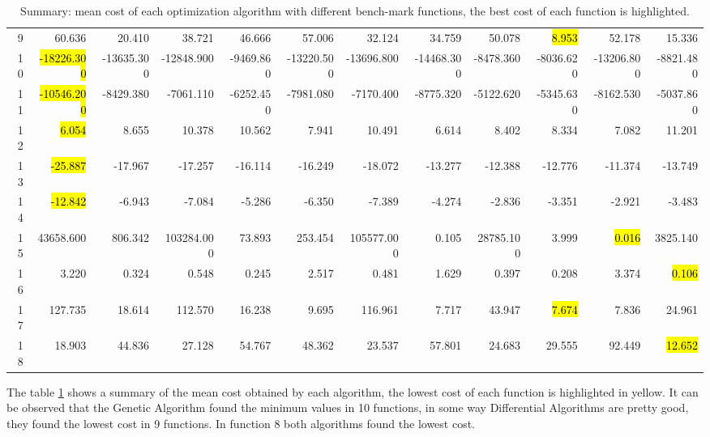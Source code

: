 \documentclass[12pt]{article}
\begin{document}
\begin{landscape}
\begin{table}[H]
\begin{tabular}{rrrrrrrrrrrr}
    9 &     60.636 &         20.410 &         38.721 &             46.666 &         57.006 &         32.124 &         34.759 &         50.078 &              \hl{8.953} &         52.178 &         15.336 \\
    10 & \hl{-18226.300} &     -13635.300 &     -12848.900 &          -9469.860 &     -13220.500 &     -13696.800 &     -14468.300 &      -8478.360 &          -8036.620 &     -13206.800 &      -8821.480 \\
    11 & \hl{-10546.200} &      -8429.380 &      -7061.110 &          -6252.450 &      -7981.080 &      -7170.400 &      -8775.320 &      -5122.620 &          -5345.630 &      -8162.530 &      -5037.860 \\
    12 &      \hl{6.054} &          8.655 &         10.378 &             10.562 &          7.941 &         10.491 &          6.614 &          8.402 &              8.334 &          7.082 &         11.201 \\
    13 &    \hl{-25.887} &        -17.967 &        -17.257 &            -16.114 &        -16.249 &        -18.072 &        -13.277 &        -12.388 &            -12.776 &        -11.374 &        -13.749 \\
    14 &    \hl{-12.842} &         -6.943 &         -7.084 &             -5.286 &         -6.350 &         -7.389 &         -4.274 &         -2.836 &             -3.351 &         -2.921 &         -3.483 \\
    15 &  43658.600 &        806.342 &     103284.000 &             73.893 &        253.454 &     105577.000 &          0.105 &      28785.100 &              3.999 &          \hl{0.016} &       3825.140 \\
    16 &      3.220 &          0.324 &          0.548 &              0.245 &          2.517 &          0.481 &          1.629 &          0.397 &              0.208 &          3.374 &          \hl{0.106} \\
    17 &    127.735 &         18.614 &        112.570 &             16.238 &          9.695 &        116.961 &          7.717 &         43.947 &              \hl{7.674} &          7.836 &         24.961 \\
    18 &     18.903 &         44.836 &         27.128 &             54.767 &         48.362 &         23.537 &         57.801 &         24.683 &             29.555 &         92.449 &         \hl{12.652} \\
    \bottomrule
\end{tabular}
\caption{Summary: mean cost of each optimization algorithm with different bench-mark functions, the best cost of each function is highlighted.} 
    \label{tab:summary}
\end{table}

The table \ref{tab:summary} shows a summary of the mean cost obtained by each algorithm, the lowest cost of each function is highlighted in yellow. It can be observed that the Genetic Algorithm found the minimum values in 10 functions, in some way Differential Algorithms are pretty good, they found the lowest cost in 9 functions. In function 8 both algorithms found the lowest cost. 
\end{landscape}
\end{document}
